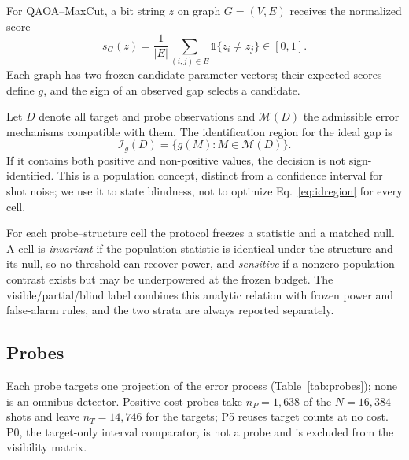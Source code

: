 \documentclass[10pt,twocolumn]{article}
\newcommand{\ind}{\mathbb{1}}
\begin{document}
For QAOA--MaxCut\cite{farhi2014,zhou2020qaoa,harrigan2021}, a bit string $z$ on
graph $G=(V,E)$ receives the normalized score
\begin{equation}
  s_G(z)=\frac{1}{|E|}\sum_{(i,j)\in E}\ind\{z_i\neq z_j\}\in[0,1].
\end{equation}
Each graph has two frozen candidate parameter vectors; their expected scores
define $g$, and the sign of an observed gap selects a candidate.

Let $D$ denote all target and probe observations and $\mathcal M(D)$ the
admissible error mechanisms compatible with them. The identification region
for the ideal gap is
\begin{equation}
  \mathcal I_g(D)=\{g(M):M\in\mathcal M(D)\}.
  \label{eq:idregion}
\end{equation}
If it contains both positive and non-positive values, the decision is not
sign-identified. This is a population concept, distinct from a confidence
interval for shot noise; we use it to state blindness, not to optimize
Eq.~\eqref{eq:idregion} for every cell.

For each probe--structure cell the protocol freezes a statistic and a matched
null. A cell is \emph{invariant} if the population statistic is identical under
the structure and its null, so no threshold can recover power, and
\emph{sensitive} if a nonzero population contrast exists but may be
underpowered at the frozen budget. The visible/partial/blind label combines
this analytic relation with frozen power and false-alarm rules, and the two
strata are always reported separately.

\subsection{Probes}

Each probe targets one projection of the error process
(Table~\ref{tab:probes}); none is an omnibus detector. Positive-cost probes
take $n_P=1{,}638$ of the $N=16{,}384$ shots and leave $n_T=14{,}746$ for the
targets; P5 reuses target counts at no cost. P0, the target-only interval
comparator, is not a probe and is excluded from the visibility matrix.
\end{document}
